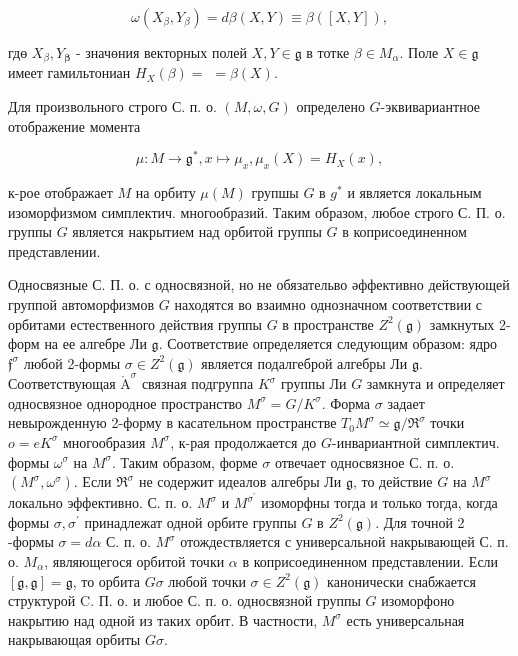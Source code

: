 \documentclass[10pt]{article}
\def\AA{\mathring{\mathrm{A}}}
\begin{document}
\[

\omega\left(X_{\beta}, Y_{\beta}\right)=d \beta(X, Y) \equiv \beta([X, Y]),

\]



гдө $X_{\beta}, Y_{\boldsymbol{\beta}}$ - значөния векторных полей $X, Y \in \mathfrak{g}$ в тотке $\beta \in M_{\alpha}$. Поле $X \in \mathfrak{g}$ имеет гамильтониан $H_{X}(\beta)=$ $=\beta(X)$.



Для произвольного строго С. п. о. $(M, \omega, G)$ определено $G$-эквивариантное отображение момента



\[

\mu: M \longrightarrow \mathfrak{g}^{*}, x \mapsto \mu_{x}, \mu_{x}(X)=H_{X}(x),

\]



к-рое отображает $M$ на орбиту $\mu(M)$ групшы $G$ в $g^{*}$ и является локальным изоморфизмом симплектич. многообразий. Таким образом, любое строго С. П. о. группы $G$ является накрытием над орбитой группы $G$ в коприсоединенном представлении.



Односвязные С. П. о. с односвязной, но не обязательво әффективно действующей группой автоморфизмов $G$ находятся во взаимно однозначном соответствии с орбитами естественного действия группы $G$ в пространстве $Z^{2}(\mathfrak{g})$ замкнутых 2-форм на ее алгебре Ли $\mathfrak{g}$. Соответствие определяется следующим образом: ядро $\mathfrak{f}^{\sigma}$ любой 2-формы $\sigma \in Z^{2}(\mathfrak{g})$ является подалгеброй алгебры Ли $\mathfrak{g}$. Соответствующая $\AA^{\sigma}$ связная подгруппа $K^{\sigma}$ группы Ли $G$ замкнута и определяет односвязное однородное пространство $M^{\sigma}=G / K^{\sigma}$. Форма $\sigma$ задает невырожденную 2-форму в касательном пространстве $T_{0} M^{\sigma} \simeq \mathfrak{g} / \Re^{\sigma}$ точки $o=e K^{\sigma}$ многообразия $M^{\sigma}$, к-рая продолжается до $G$-инвариантной симплектич. формы $\omega^{\sigma}$ на $M^{\sigma}$. Таким образом, форме $\sigma$ отвечает односвязное С. п. о. $\left(M^{\sigma}, \omega^{\sigma}\right)$. Если $\mathfrak{R}^{\sigma}$ не содержит идеалов алгебры Ли $\mathfrak{g}$, то действие $G$ на $M^{\sigma}$ локально эффективно. С. п. о. $M^{\sigma}$ и $M^{\sigma^{\prime}}$ изоморфны тогда и только тогда, когда формы $\sigma, \sigma^{\prime}$ принадлежат одной орбите группы $G$ в $Z^{2}(\mathfrak{g})$. Для точной 2 -формы $\sigma=d \alpha$ С. п. о. $M^{\sigma}$ отождествляется с универсальной накрывающей С. п. о. $M_{\alpha}$, являющегося орбитой точки $\alpha$ в коприсоединенном представлении. Если $[\mathfrak{g}, \mathfrak{g}]=\mathfrak{g}$, то орбита $G \sigma$ любой точки $\sigma \in Z^{2}(\mathfrak{g})$ канонически снабжается структурой C. П. о. и любое С. п. о. односвязной группы $G$ изоморфоно накрытию над одной из таких орбит. В частности, $M^{\sigma}$ есть универсальная накрывающая орбиты $G \sigma$.
\end{document}
